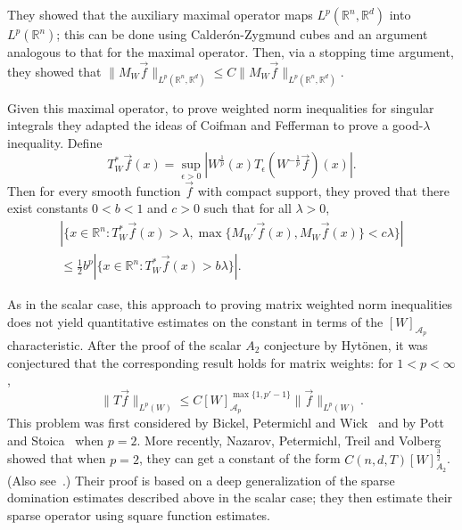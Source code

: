 \documentclass[12pt]{amsart}
\theoremstyle{definition}
\theoremstyle{remark}
\numberwithin{equation}{section}
\newcommand{\rn}{{{\mathbb R}^n}}
\newcommand{\rd}{{{\mathbb R}^d}}
\newcommand{\A}{\mathcal A}
\newcommand{\vecf}{\vec{f}}
\begin{document}
They showed that the auxiliary maximal operator maps $L^p(\rn,\rd)$ into
$L^p(\rn)$; this can be done using Calder\'on-Zygmund cubes and an argument analogous to
that for the maximal operator.  Then, via a  stopping time
argument, they showed that
$\|M_W\vecf\|_{L^p(\rn,\rd)} \leq C \|M_W\vecf\|_{L^p(\rn,\rd)}$.

Given this maximal operator, to prove weighted norm inequalities for
singular integrals they adapted the ideas of Coifman and Fefferman to
prove a good-$\lambda$ inequality.  Define
%
\[ T_W^*\vecf(x) = \sup_{\epsilon>0}
  |W^{\frac1p}(x)T_\epsilon(W^{-\frac1p}\vecf)(x)|. \]
%
Then for every smooth function $\vecf$ with compact support, they
proved that there exist constants $0<b<1$ and $c>0$ such that for all
$\lambda>0$,
%
\begin{multline*}
  |\{x\in \rn : T_W^*\vecf(x)>\lambda,
  \max\{ M_W'\vecf(x), M_W\vecf(x)\}<c\lambda\}| \\
  \leq
  \frac{1}{2}b^p|\{x\in \rn : T_W^*\vecf(x) > b\lambda\}|. 
\end{multline*}

\medskip

As in the scalar case, this approach to proving matrix weighted norm
inequalities does not yield quantitative estimates on the constant in
terms of the $[W]_{\A_p}$ characteristic.  After the proof of the
  scalar $A_2$ conjecture by Hyt\"onen,  it was conjectured that the
  corresponding result holds for matrix weights:  for $1<p<\infty$, 
  \[ \|T\vecf\|_{L^p(W)}
    \leq
    C[W]_{\A_p}^{\max\{1,p'-1\}}\|\vecf\|_{L^p(W)}.  \]
  This problem was first considered by Bickel, Petermichl and
Wick~\cite{MR3452715} and by Pott and Stoica~\cite{MR3698161} when
$p=2$.  More recently,  Nazarov, Petermichl, Treil and
Volberg~\cite{MR3689742} showed that when $p=2$, they can get a
constant of the form $C(n,d,T)[W]_{A_2}^{\frac32}$.  (Also
see~\cite{MR3818613}.)  Their proof is based on a deep
generalization of the sparse domination estimates described above in
the scalar case; they then estimate their sparse operator using square
function estimates.    
\end{document}
